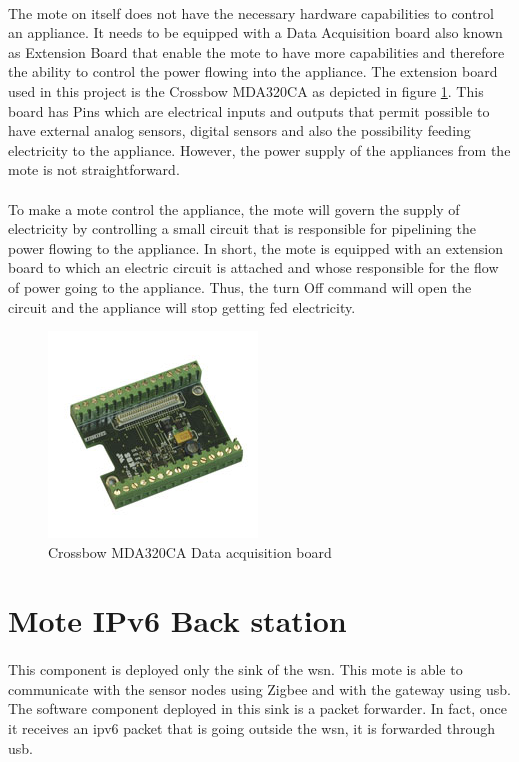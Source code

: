\documentclass[oneside,12pt,a4paper,final]{book}
\begin{document}
\paragraph{}
The mote on itself does not have the necessary hardware capabilities to control an appliance. It needs to be equipped with a Data Acquisition board also known as Extension Board that enable the mote to have more capabilities and therefore the ability to control the power flowing into the appliance. The extension board used in this project is the Crossbow MDA320CA as depicted in figure \ref{fig:mda320ca}. This board has Pins which are electrical inputs and outputs that permit possible to have external analog sensors, digital sensors and also the possibility feeding electricity to the appliance. However, the power supply of the appliances from the mote is not straightforward.
\paragraph{}
To make a mote control the appliance, the mote will govern the supply of electricity by controlling a small circuit that is responsible for pipelining the power flowing to the appliance. In short, the mote is equipped with an extension board to which an electric circuit is attached and whose responsible for the flow of power going to the appliance. Thus, the turn Off command will open the circuit and the appliance will stop getting fed electricity.

\begin{figure}[htbp]
\centering
\includegraphics[scale=0.8]{img/mda320.jpg}
\caption{Crossbow MDA320CA Data acquisition board}
\label{fig:mda320ca}
\end{figure}

\section{Mote IPv6 Back station}
\paragraph{} 
This component is deployed only the sink of the \gls{wsn}. This mote is able to communicate with the sensor nodes using Zigbee and with the gateway using \gls{usb}. The software component deployed in this sink is a packet forwarder. In fact, once it receives an \gls{ipv6} packet that is going outside the \gls{wsn}, it is forwarded through \gls{usb}.
\end{document}
